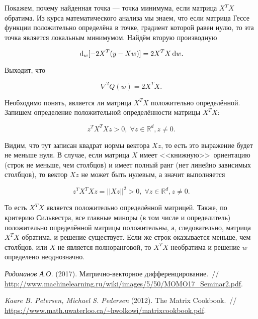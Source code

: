 \documentclass[12pt,fleqn]{article}
\newcommand{\dx}[1]{\,\mathrm{d}#1} %
\begin{document}
Покажем, почему найденная точка — точка минимума, если матрица $X^T X$ обратима. Из курса математического анализа мы знаем, что если матрица Гессе функции положительно определёна в точке, градиент которой равен нулю, то эта точка является локальным минимумом. Найдём вторую производную 

\[
\dx_w[-2X^T(y-Xw)] = 2X^TX \dx w.
\]

Выходит, что 

\[
\nabla^2 Q(w) = 2X^TX.
\]

Необходимо понять, является ли матрица $X^TX$ положительно определённой. Запишем определение положительной определённости матрицы  $X^TX$:

\[
z^TX^TXz > 0, \; \forall z \in \mathbb{R}^d, z \ne 0.
\]

Видим, что тут записан квадрат нормы вектора $Xz$, то есть это выражение будет не меньше нуля. В случае, если матрица $X$ имеет <<книжную>>\ ориентацию (строк не меньше, чем столбцов) и имеет полный ранг (нет линейно зависимых столбцов), то вектор $Xz$ не может быть нулевым, а значит выполняется

\[
z^TX^TXz = ||Xz||^2 > 0, \; \forall z \in \mathbb{R}^d, z \ne 0.
\]

То есть $X^TX$ является положительно определённой матрицей. Также, по критерию Сильвестра, все главные миноры (в том числе и определитель) положительно определённой матрицы положительны, а, следовательно, матрица $X^TX$ обратима, и решение существует. Если же строк оказывается меньше, чем столбцов, или $X$ не является полноранговой, то $X^TX$ необратима и решение $w$ определено неоднозначно. 

\begin{thebibliography}{1}
	\emph{Родоманов А.О.} (2017).
	Матрично-векторное дифференцирование.~//
	\url{http://www.machinelearning.ru/wiki/images/5/50/MOMO17_Seminar2.pdf}.
	
	\emph{Kaare B. Petersen, Michael S. Pedersen} (2012).
	The Matrix Cookbook.~//
	\url{https://www.math.uwaterloo.ca/~hwolkowi/matrixcookbook.pdf}.
\end{thebibliography}
\end{document}
